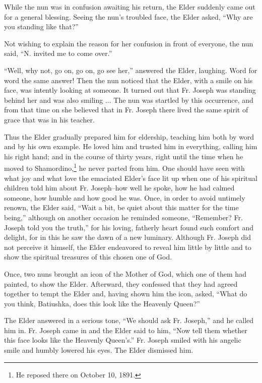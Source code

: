 While the nun was in confusion awaiting his return, the Elder suddenly came out for a general blessing. Seeing the nun's troubled face, the Elder asked, ``Why are you standing like that?''

Not wishing to explain the reason for her confusion in front of everyone, the nun said, ``N. invited me to come over.''

``Well, why not, go on, go on, go see her,'' answered the Elder, laughing. Word for word the same answer! Then the nun noticed that the Elder, with a smile on his face, was intently looking at someone. It turned out that Fr. Joseph was standing behind her and was also smiling ... The nun was startled by this occurrence, and from that time on she believed that in Fr. Joseph there lived the same spirit of grace that was in his teacher.

Thus the Elder gradually prepared him for eldership, teaching him both by word and by his own example. He loved him and trusted him in everything, calling him his right hand; and in the course of thirty years, right until the time when he moved to Shamordino,\footnote{He reposed there on October 10, 1891.} he never parted from him. One should have seen with what joy and what love the emaciated Elder's face lit up when one of his spiritual children told him about Fr. Joseph--how well he spoke, how he had calmed someone, how humble and how good he was. Once, in order to avoid untimely renown, the Elder said, ``Wait a bit, be quiet about this matter for the time being,'' although on another occasion he reminded someone, ``Remember? Fr. Joseph told you the truth,'' for his loving, fatherly heart found such comfort and delight, for in this he saw the dawn of a new luminary. Although Fr. Joseph did not perceive it himself, the Elder endeavored to reveal him little by little and to show the spiritual treasures of this chosen one of God.

Once, two nuns brought an icon of the Mother of God, which one of them had painted, to show the Elder. Afterward, they confessed that they had agreed together to tempt the Elder and, having shown him the icon, asked, ``What do you think, Batiushka, does this look like the Heavenly Queen?''

The Elder answered in a serious tone, ``We should ask Fr. Joseph,'' and he called him in. Fr. Joseph came in and the Elder said to him, ``Now tell them whether this face looks like the Heavenly Queen’s.'' Fr. Joseph smiled with his angelic smile and humbly lowered his eyes. The Elder dismissed him.

